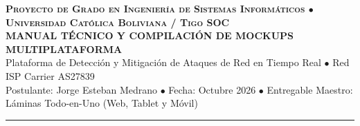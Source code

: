 \documentclass[11pt]{article}
\begin{document}
\pagestyle{empty}

\begin{center}
    {\large\scshape\bfseries\color{primarydark} Proyecto de Grado en Ingeniería de Sistemas Informáticos \quad $\bullet$ \quad Universidad Católica Boliviana / Tigo SOC}\\[4bp]
    {\LARGE\bfseries\color{textprimary} MANUAL TÉCNICO Y COMPILACIÓN DE MOCKUPS MULTIPLATAFORMA}\\[4bp]
    {\normalsize\color{textsecondary} Plataforma de Detección y Mitigación de Ataques de Red en Tiempo Real \quad $\bullet$ \quad Red ISP Carrier AS27839}\\[2bp]
    {\small\color{textmuted} Postulante: Jorge Esteban Medrano \quad $\bullet$ \quad Fecha: Octubre 2026 \quad $\bullet$ \quad Entregable Maestro: Láminas Todo-en-Uno (Web, Tablet y Móvil)}
\end{center}

\vspace{-4bp}
\noindent\textcolor{primary}{\rule{\textwidth}{1.5bp}}
\vspace{4bp}
\end{document}
